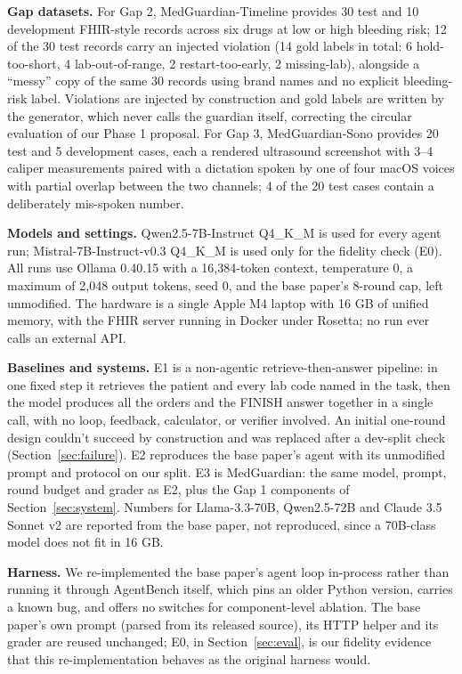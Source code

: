 \documentclass[conference]{IEEEtran}
\begin{document}
\textbf{Gap datasets.} For Gap 2, MedGuardian-Timeline provides 30 test and 10 development FHIR-style records across six drugs at low or high bleeding risk; 12 of the 30 test records carry an injected violation (14 gold labels in total: 6 hold-too-short, 4 lab-out-of-range, 2 restart-too-early, 2 missing-lab), alongside a ``messy'' copy of the same 30 records using brand names and no explicit bleeding-risk label. Violations are injected by construction and gold labels are written by the generator, which never calls the guardian itself, correcting the circular evaluation of our Phase 1 proposal. For Gap 3, MedGuardian-Sono provides 20 test and 5 development cases, each a rendered ultrasound screenshot with 3--4 caliper measurements paired with a dictation spoken by one of four macOS voices with partial overlap between the two channels; 4 of the 20 test cases contain a deliberately mis-spoken number.

\textbf{Models and settings.} Qwen2.5-7B-Instruct Q4\_K\_M \cite{qwen2025qwen25} is used for every agent run; Mistral-7B-Instruct-v0.3 Q4\_K\_M \cite{jiang2023mistral} is used only for the fidelity check (E0). All runs use Ollama 0.40.15 with a 16,384-token context, temperature 0, a maximum of 2,048 output tokens, seed 0, and the base paper's 8-round cap, left unmodified. The hardware is a single Apple M4 laptop with 16 GB of unified memory, with the FHIR server running in Docker under Rosetta; no run ever calls an external API.

\textbf{Baselines and systems.} E1 is a non-agentic retrieve-then-answer pipeline: in one fixed step it retrieves the patient and every lab code named in the task, then the model produces all the orders and the FINISH answer together in a single call, with no loop, feedback, calculator, or verifier involved. An initial one-round design couldn't succeed by construction and was replaced after a dev-split check (Section~\ref{sec:failure}). E2 reproduces the base paper's agent with its unmodified prompt and protocol on our split. E3 is MedGuardian: the same model, prompt, round budget and grader as E2, plus the Gap 1 components of Section~\ref{sec:system}. Numbers for Llama-3.3-70B, Qwen2.5-72B and Claude 3.5 Sonnet v2 are reported from the base paper, not reproduced, since a 70B-class model does not fit in 16 GB.

\textbf{Harness.} We re-implemented the base paper's agent loop in-process rather than running it through AgentBench \cite{liu2024agentbench} itself, which pins an older Python version, carries a known bug, and offers no switches for component-level ablation. The base paper's own prompt (parsed from its released source), its HTTP helper and its grader are reused unchanged; E0, in Section~\ref{sec:eval}, is our fidelity evidence that this re-implementation behaves as the original harness would.
\end{document}
